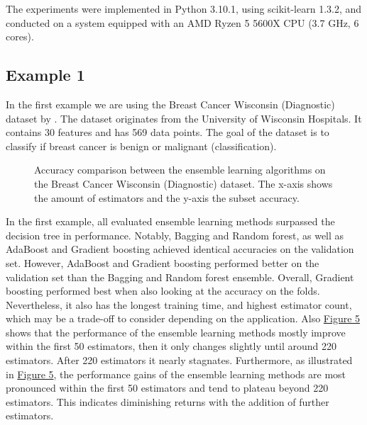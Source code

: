 The experiments were implemented in Python 3.10.1, using scikit-learn 1.3.2, and
conducted on a system equipped with an AMD Ryzen 5 5600X CPU (3.7 GHz, 6 cores).

\newpage %
\subsection{Example 1}
In the first example we are using the Breast Cancer Wisconsin (Diagnostic)
dataset by \citet*{breast_cancer_wisconsin}. The dataset originates from
the University of Wisconsin Hospitals. It contains 30 features and has 569
data points. The goal of the dataset is to classify if breast cancer
is benign or malignant (classification).



\begin{figure}[htbp]
    \centering
    \label{fig:bcw_comparison}
    \caption{
        Accuracy comparison between the ensemble learning algorithms on the Breast Cancer 
        Wisconsin (Diagnostic) dataset.
        The x-axis shows the amount of estimators and the y-axis the subset accuracy.
    }
\end{figure}

In the first example, all evaluated ensemble learning methods surpassed the decision tree in performance.
Notably, Bagging and Random forest, as well as AdaBoost and Gradient boosting achieved identical accuracies
on the validation set. However, AdaBoost and Gradient boosting performed better on the validation set than
the Bagging and Random forest ensemble.
Overall, Gradient boosting performed best when also looking at the accuracy on the folds. Nevertheless,
it also has the longest training time, and highest estimator count, which may be a trade-off to 
consider depending on the application.
Also \hyperref[fig:bcw_comparison]{Figure 5} shows that the performance of the ensemble learning 
methods mostly improve within the first 50 estimators, then it only changes slightly until around 220 estimators.
After 220 estimators it nearly stagnates.
Furthermore, as illustrated in \hyperref[fig:bcw_comparison]{Figure 5}, the performance gains of the ensemble
learning methods are most pronounced within the first 50 estimators and tend to plateau beyond 220 estimators.
This indicates diminishing returns with the addition of further estimators.

